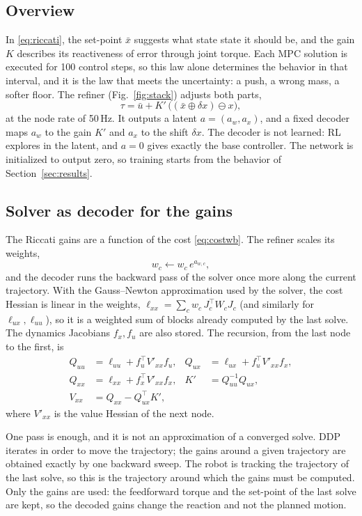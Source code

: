 \documentclass[conference]{IEEEtran}
\newcommand{\T}{^{\top}}
\newcommand{\xb}{\bar{x}}
\newcommand{\ub}{\bar{u}}
\begin{document}
\subsection{Overview}
In \eqref{eq:riccati}, the set-point $\xb$ suggests what state state it should be, and the gain $K$ describes its reactiveness of error through joint torque.
Each MPC solution is executed for 100 control steps, so this law alone determines the behavior in that interval, and it is the law that meets the uncertainty: a push, a wrong mass, a softer floor.
The refiner (Fig.~\ref{fig:stack}) adjusts both parts,
\begin{equation}
\tau=\ub+K'\,\big((\xb\oplus\delta x)\ominus x\big),
\label{eq:refined}
\end{equation}
at the node rate of 50\,Hz.
It outputs a latent $a=(a_w,a_x)$, and a fixed decoder maps $a_w$ to the gain $K'$ and $a_x$ to the shift $\delta x$.
The decoder is not learned: RL explores in the latent, and $a=0$ gives exactly the base controller.
The network is initialized to output zero, so training starts from the behavior of Section~\ref{sec:results}.

\subsection{Solver as decoder for the gains}
The Riccati gains are a function of the cost \eqref{eq:costwb}.
The refiner scales its weights,
\begin{equation}
w_c\leftarrow w_c\,e^{a_{w,c}},
\label{eq:scale}
\end{equation}
and the decoder runs the backward pass of the solver once more along the current trajectory.
With the Gauss--Newton approximation used by the solver, the cost Hessian is linear in the weights, $\ell_{xx}=\sum_c w_c\,J_c\T W_cJ_c$ (and similarly for $\ell_{ux},\ell_{uu}$), so it is a weighted sum of blocks already computed by the last solve.
The dynamics Jacobians $f_x,f_u$ are also stored.
The recursion, from the last node to the first, is
\begin{align}
Q_{uu}&=\ell_{uu}+f_u\T V'_{xx}f_u, &Q_{ux}&=\ell_{ux}+f_u\T V'_{xx}f_x,\nonumber\\
Q_{xx}&=\ell_{xx}+f_x\T V'_{xx}f_x, &K'&=Q_{uu}^{-1}Q_{ux},\nonumber\\
V_{xx}&=Q_{xx}-Q_{ux}\T K', &&
\label{eq:backward}
\end{align}
where $V'_{xx}$ is the value Hessian of the next node.

One pass is enough, and it is not an approximation of a converged solve.
DDP iterates in order to move the trajectory; the gains around a given trajectory are obtained exactly by one backward sweep.
The robot is tracking the trajectory of the last solve, so this is the trajectory around which the gains must be computed.
Only the gains are used: the feedforward torque and the set-point of the last solve are kept, so the decoded gains change the reaction and not the planned motion.
\end{document}
